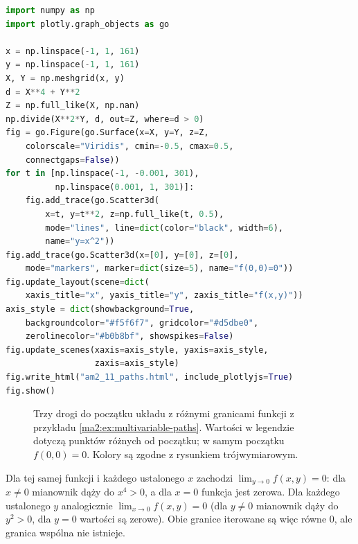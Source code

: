 \begin{lstlisting}[language=Python]
import numpy as np
import plotly.graph_objects as go

x = np.linspace(-1, 1, 161)
y = np.linspace(-1, 1, 161)
X, Y = np.meshgrid(x, y)
d = X**4 + Y**2
Z = np.full_like(X, np.nan)
np.divide(X**2*Y, d, out=Z, where=d > 0)
fig = go.Figure(go.Surface(x=X, y=Y, z=Z,
    colorscale="Viridis", cmin=-0.5, cmax=0.5,
    connectgaps=False))
for t in [np.linspace(-1, -0.001, 301),
          np.linspace(0.001, 1, 301)]:
    fig.add_trace(go.Scatter3d(
        x=t, y=t**2, z=np.full_like(t, 0.5),
        mode="lines", line=dict(color="black", width=6),
        name="y=x^2"))
fig.add_trace(go.Scatter3d(x=[0], y=[0], z=[0],
    mode="markers", marker=dict(size=5), name="f(0,0)=0"))
fig.update_layout(scene=dict(
    xaxis_title="x", yaxis_title="y", zaxis_title="f(x,y)"))
axis_style = dict(showbackground=True,
    backgroundcolor="#f5f6f7", gridcolor="#d5dbe0",
    zerolinecolor="#b0b8bf", showspikes=False)
fig.update_scenes(xaxis=axis_style, yaxis=axis_style,
                  zaxis=axis_style)
fig.write_html("am2_11_paths.html", include_plotlyjs=True)
fig.show()
\end{lstlisting}


\begin{figure}[htbp]
\centering
{}
\caption{Trzy drogi do początku układu z różnymi granicami
funkcji z przykładu \ref{ma2:ex:multivariable-paths}.
Wartości w legendzie dotyczą punktów różnych od początku;
w samym początku $f(0,0)=0$. Kolory są zgodne z rysunkiem trójwymiarowym.}
\label{ma2:fig:multivariable-paths}
\end{figure}

\begin{przyklad}
Dla tej samej funkcji i każdego ustalonego $x$ zachodzi
$\lim_{y\to0}f(x,y)=0$: dla $x\ne0$ mianownik dąży
do $x^4>0$, a dla $x=0$ funkcja jest zerowa.
Dla każdego ustalonego $y$ analogicznie
$\lim_{x\to0}f(x,y)=0$ (dla $y\ne0$ mianownik dąży
do $y^2>0$, dla $y=0$ wartości są zerowe).
Obie granice iterowane są więc równe $0$,
ale granica wspólna nie istnieje.
\end{przyklad}

